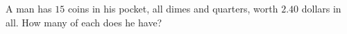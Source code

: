 A man has $15$ coins in his pocket, all dimes and quarters, worth $2.40$ dollars in all. How many of each does he have?
